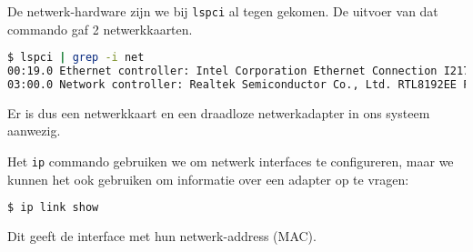 De netwerk-hardware zijn we bij \texttt{lspci} al tegen gekomen. De uitvoer van dat commando gaf 2 netwerkkaarten.
\begin{lstlisting}[language=bash]
$ lspci | grep -i net
00:19.0 Ethernet controller: Intel Corporation Ethernet Connection I217-LM (rev 04)
03:00.0 Network controller: Realtek Semiconductor Co., Ltd. RTL8192EE PCIe Wireless Network Adapter
\end{lstlisting}
Er is dus een netwerkkaart en een draadloze netwerkadapter in ons systeem aanwezig.

Het \texttt{ip} commando gebruiken we om netwerk interfaces te configureren, maar we kunnen het ook gebruiken om informatie over een adapter op te vragen:
\begin{lstlisting}[language=bash]
$ ip link show
\end{lstlisting}
Dit geeft de interface met hun netwerk-address (MAC).


